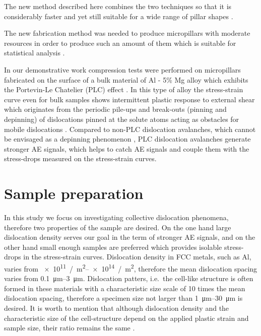 The new method described here combines the two techniques so that it is considerably faster and yet still suitable for a wide range of pillar shapes \cite{wurster2015novel}.

The new fabrication method was needed to produce micropillars with moderate resources in order to produce such an amount of them which is suitable for statistical analysis \cite{ispanovity2010submicron}.

In our demonstrative work compression tests were performed on micropillars fabricated on the surface of a bulk material of Al - 5\% Mg alloy which exhibits the Portevin-Le Chatelier (PLC)  effect \cite{TABATA1980795,chinh2000critical,GUBICZA200455,1468-6996-12-6-063001}. In this type of alloy the stress-strain curve even for bulk samples shows intermittent plastic response to external shear which originates from the periodic pile-ups and break-outs (pinning and depinning) of dislocations pinned at the solute atoms acting as obstacles for mobile dislocations \cite{GUBICZA200455,1468-6996-12-6-063001}. Compared to non-PLC dislocation avalanches, which cannot be envisaged as a depinning phenomenon \cite{PhysRevLett.112.235501}, PLC dislocation avalanches generate stronger AE signals, which helps to catch AE signals and couple them with the stress-drops measured on the stress-strain curves.

\section{Sample preparation}
In this study we focus on investigating collective dislocation phenomena, therefore two properties of the sample are desired. On the one hand large dislocation density serves our goal in the term of stronger AE signals, and on the other hand small enough samples are preferred which provides isolable stress-drops in the stress-strain curves. Dislocation density in FCC metals, such as Al, varies from \SIrange{e11}{e14}{/m^2}, therefore the mean dislocation spacing varies from \SIrange{0.1}{3}{\micro\meter}. Dislocation patters, i.e.\ the cell-like structure is often formed in these materials with a characteristic size scale of 10 times the mean dislocation spacing, therefore a specimen size not larger than \SIrange{1}{30}{\micro\meter} is desired. It is worth to mention that although dislocation density and the characteristic size of the cell-structure depend on the applied plastic strain and sample size, their ratio remains the same \cite{doi:10.1080/14786435.2014.906755,el2015unravelling}.

